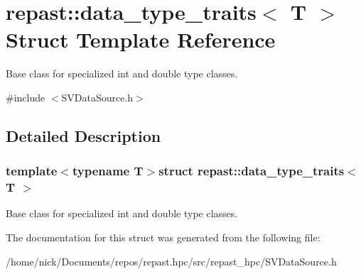 \hypertarget{structrepast_1_1data__type__traits}{\section{repast\-:\-:data\-\_\-type\-\_\-traits$<$ T $>$ Struct Template Reference}
\label{structrepast_1_1data__type__traits}
}


Base class for specialized int and double type classes.  




{\ttfamily \#include $<$S\-V\-Data\-Source.\-h$>$}



\subsection{Detailed Description}
\subsubsection*{template$<$typename T$>$struct repast\-::data\-\_\-type\-\_\-traits$<$ T $>$}

Base class for specialized int and double type classes. 

The documentation for this struct was generated from the following file\-:\begin{DoxyCompactItemize}
\item 
/home/nick/\-Documents/repos/repast.\-hpc/src/repast\-\_\-hpc/S\-V\-Data\-Source.\-h\end{DoxyCompactItemize}
